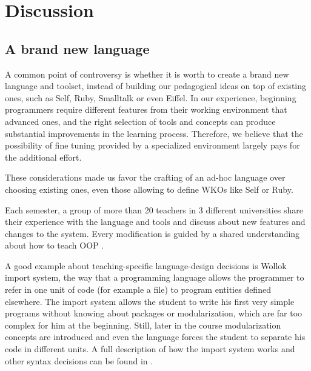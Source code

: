 \section{Discussion}
\label{sec:discussion}


\subsection{A brand new language}
\label{sec:newLanguage}
A common point of controversy is whether it is worth to create a brand new language and toolset, 
instead of building our pedagogical ideas on top of existing ones, such as Self, Ruby, Smalltalk or even Eiffel.
In our experience, beginning programmers require different features from their working environment that advanced ones,
and the right selection of tools and concepts can produce substantial improvements in the learning process.
Therefore, we believe that the possibility of fine tuning provided by a specialized environment largely pays for the additional effort.

These considerations made us favor the crafting of an ad-hoc language over choosing existing ones, even those allowing to define WKOs like Self or Ruby.

Each semester, a group of more than 20 teachers in 3 different universities share their experience with the language and tools and discuss about new features and changes to the system. 
Every modification is guided by a shared understanding about how to teach OOP \cite{lombardi_instances_2007,lombardi_carlos_alumnos_2008,griggio_programming_2011,spigariol_lucas_ensenando_2013}.

A good example about teaching-specific language-design decisions is Wollok import system,
\ie the way that a programming language allows the programmer to refer in one unit of code (for example a file) to program entities defined elsewhere.
The import system allows the student to write his first very simple programs without knowing about packages or modularization, which are far too complex for him at the beginning. Still, later in the course modularization concepts are introduced and even the language forces the student to separate his code in different units. 
A full description of how the import system works and other syntax decisions can be found in \cite{javier_fernandes_wollok_2014}.

